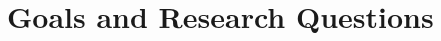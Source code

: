 \section{Goals and Research Questions}
\label{sec:goals-and-research-questions}

\begin{comment}
A research project needs to have one or several question(s) that should be answered.
It is desirable to formulate such questions as early as possible as they provide both an important driving force for the project and clarity as to the goals sought.
However, expect to refine the questions and thus the final path of the project as work progresses.
Any refinements should be conducted with care, so as to avoid that the original aims and previous work are lost.
It is always good to have one (or max two) research goals and perhaps some subgoals,
together with 2--3 explicit research questions (or max four).

\begin{description}
    \item[Goal] \textit{Lorem ipsum dolor sit amet, consectetur adipiscing elit.}
\end{description}

Your goal/objective should be described in a single sentence.
In the text underneath it you can expand on this sentence to clarify what is meant by the short goal description.
The goal of your work is what you are trying to achieve. This can either be the goal of your actual project or
can be a broader goal that you have taken steps towards achieving. Such steps should be expressed in the research questions.
Note that the goal is seldom to build a system. A system is built to enable experiments to be conducted.
The research goal stages the needs that the system is implemented to meet.

\begin{description}
    \item[Research question 1] \textit{Lorem ipsum dolor sit amet, consectetur adipiscing elit.}
\end{description}

Each research question provides a sub-goal and these should be precise and clearly stated enabling the reader to match your results to the original goals.
They will also form the driving force for the experimental plan.

\begin{description}
    \item[Research question 2] \textit{Lorem ipsum dolor sit amet, consectetur adipiscing elit.}
\end{description}


\end{comment}
